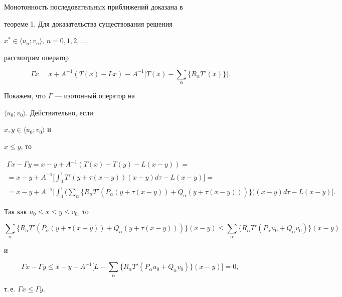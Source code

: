\begin{pf} Монотонность последовательных приближений доказана в


теореме 1. Для доказательства существования решения


$x^*\in\langle u_n;v_n\rangle$, $n=0,1,2,\dotsc$,


рассмотрим оператор


\begin{equation}


\Gamma x=x+A^{-1}(T(x)-Lx)\equiv A^{-1}


\biggl[T(x)-\sum_\alpha\{R_\alpha T'(x)\}\biggr].


\end{equation}


Покажем, что $\Gamma$ --- изотонный оператор на


$\langle u_0;v_0\rangle$. Действительно, если


$x,y\in\langle u_0;v_0\rangle$ и


$x\le y$, то


\begin{gather*}


\Gamma x-\Gamma y=x-y+A^{-1}(T(x)-T(y)-L(x-y))=\\


=x-y+A^{-1}\biggl[\int^1_0 T'(y+\tau(x-y))(x-y)d\tau-L(x-y)\biggr]=\\


=x-y+A^{-1}\biggl[ \int^1_0\biggl(\sum_\alpha\{R_\alpha T'


(P_\alpha(y+\tau(x-y))+Q_\alpha(y+\tau(x-y)))\}\biggr)


(x-y)d\tau-L(x-y)\biggr].


\end{gather*}


Так как $u_0\le x\le y\le v_0$, то


$$


\sum_\alpha\{R_\alpha T'(P_\alpha(y+\tau(x-y))+Q_\alpha(y+\tau(x-y)))\}


(x-y)\le\sum_\alpha\{R_\alpha T'(P_\alpha u_0+Q_\alpha v_0)\}


(x-y)


$$


и


$$


\Gamma x-\Gamma y\le x-y-A^{-1}\biggl[L-\sum_\alpha


\{R_\alpha T'(P_\alpha u_0+Q_\alpha v_0)\}(x-y)\biggr]=0,


$$


т.\,е. $\Gamma x\le \Gamma y$.



\end{pf}
